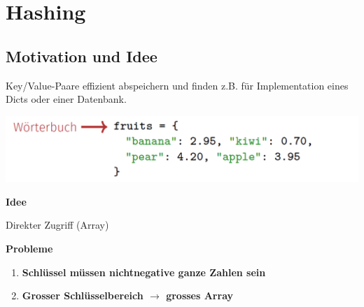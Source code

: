 \section{Hashing}
\vspace{-4pt}
\begin{sectionbox}
\subsection{Motivation und Idee}\smallskip
Key/Value-Paare effizient abspeichern und finden z.B. für Implementation eines Dicts oder einer Datenbank.\par\smallskip

\begin{center}
    \includegraphics[width = 0.8\columnwidth]{../img/BspPreHashing.png}
\end{center}\smallskip

\textbf{Idee}\par
Direkter Zugriff (Array)\par\smallskip
\begin{greenbox}
\textbf{Probleme}\par
\begin{enumerate}
    \item \textbf{Schlüssel müssen nichtnegative ganze Zahlen sein}
    \item \textbf{Grosser Schlüsselbereich $\rightarrow$ grosses Array}
\end{enumerate}
\end{greenbox}
\end{sectionbox}
\vspace{-4pt}

